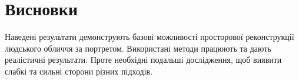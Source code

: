 \section{Висновки}

Наведені результати демонструють базові можливості
просторової реконструкції людського обличчя за портретом.
Використані методи працюють та дають реалістичні результати.
Проте необхідні подальші дослідження,
щоб виявити слабкі та сильні сторони різних підходів.
